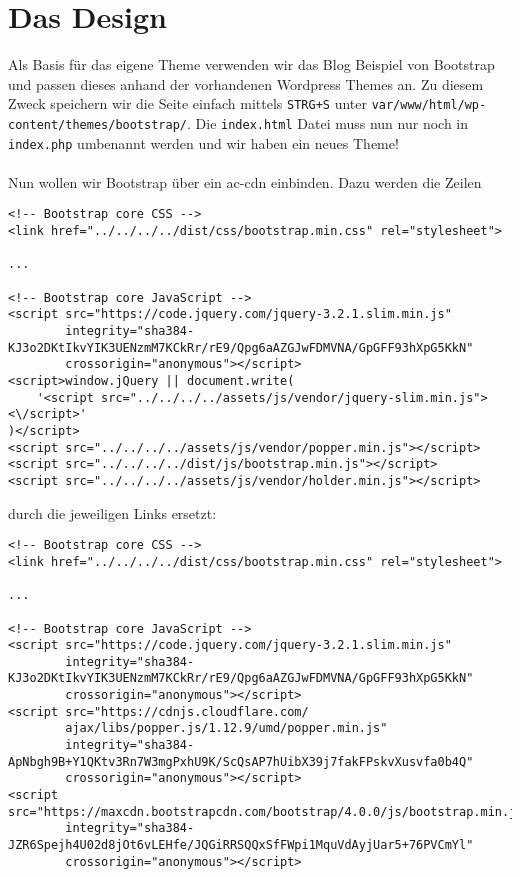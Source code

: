\documentclass[minted]{school}
\begin{document}
\section{Das Design}
Als Basis für das eigene Theme verwenden wir das Blog Beispiel\cite{bp-blog} von Bootstrap und passen dieses anhand der vorhandenen Wordpress Themes an.
Zu diesem Zweck speichern wir die Seite einfach mittels \verb|STRG+S| unter \verb|var/www/html/wp-content/themes/bootstrap/|. Die \verb|index.html| Datei muss nun nur noch in \verb|index.php| umbenannt werden und wir haben ein neues Theme!
\\\\
Nun wollen wir Bootstrap über ein \gls{ac-cdn} einbinden. Dazu werden die Zeilen
\begin{verbatim}
<!-- Bootstrap core CSS -->
<link href="../../../../dist/css/bootstrap.min.css" rel="stylesheet">

...

<!-- Bootstrap core JavaScript -->
<script src="https://code.jquery.com/jquery-3.2.1.slim.min.js" 
		integrity="sha384-KJ3o2DKtIkvYIK3UENzmM7KCkRr/rE9/Qpg6aAZGJwFDMVNA/GpGFF93hXpG5KkN" 
		crossorigin="anonymous"></script>
<script>window.jQuery || document.write(
	'<script src="../../../../assets/js/vendor/jquery-slim.min.js"><\/script>'
)</script>
<script src="../../../../assets/js/vendor/popper.min.js"></script>
<script src="../../../../dist/js/bootstrap.min.js"></script>
<script src="../../../../assets/js/vendor/holder.min.js"></script>
\end{verbatim}
durch die jeweiligen Links ersetzt:
\begin{verbatim}
<!-- Bootstrap core CSS -->
<link href="../../../../dist/css/bootstrap.min.css" rel="stylesheet">

...

<!-- Bootstrap core JavaScript -->
<script src="https://code.jquery.com/jquery-3.2.1.slim.min.js"
		integrity="sha384-KJ3o2DKtIkvYIK3UENzmM7KCkRr/rE9/Qpg6aAZGJwFDMVNA/GpGFF93hXpG5KkN" 
		crossorigin="anonymous"></script>
<script src="https://cdnjs.cloudflare.com/
		ajax/libs/popper.js/1.12.9/umd/popper.min.js" 
		integrity="sha384-ApNbgh9B+Y1QKtv3Rn7W3mgPxhU9K/ScQsAP7hUibX39j7fakFPskvXusvfa0b4Q" 
		crossorigin="anonymous"></script>
<script src="https://maxcdn.bootstrapcdn.com/bootstrap/4.0.0/js/bootstrap.min.js" 
		integrity="sha384-JZR6Spejh4U02d8jOt6vLEHfe/JQGiRRSQQxSfFWpi1MquVdAyjUar5+76PVCmYl" 
		crossorigin="anonymous"></script>
\end{verbatim}
\end{document}
